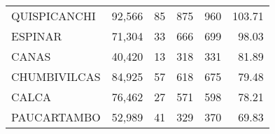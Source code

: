\begin{tabular}{lrrrrr}
	\cellcolor[HTML]{9AFF99}QUISPICANCHI                                               & 92,566                                                         & 85                                                         & 875                                                         & 960                                                                 & 103.71                                                                       \\
	\cellcolor[HTML]{9AFF99}ESPINAR                                                    & 71,304                                                         & 33                                                         & 666                                                         & 699                                                                 & 98.03                                                                        \\
	\cellcolor[HTML]{9AFF99}CANAS                                                      & 40,420                                                         & 13                                                         & 318                                                         & 331                                                                 & 81.89                                                                        \\
	\cellcolor[HTML]{9AFF99}CHUMBIVILCAS                                               & 84,925                                                         & 57                                                         & 618                                                         & 675                                                                 & 79.48                                                                        \\
	\cellcolor[HTML]{9AFF99}CALCA                                                      & 76,462                                                         & 27                                                         & 571                                                         & 598                                                                 & 78.21                                                                        \\
	\cellcolor[HTML]{9AFF99}PAUCARTAMBO                                                & 52,989                                                         & 41                                                         & 329                                                         & 370                                                                 & 69.83                                                                        \\

\end{tabular}
